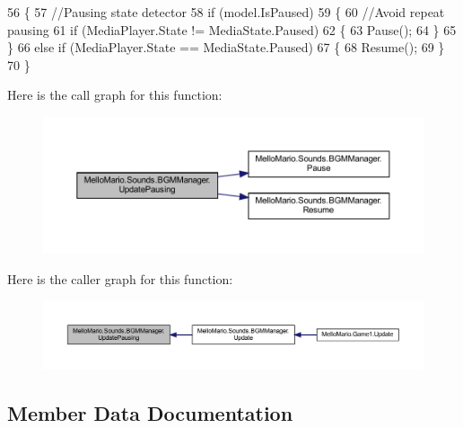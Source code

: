\begin{DoxyCode}
56         \{
57             \textcolor{comment}{//Pausing state detector}
58             \textcolor{keywordflow}{if} (model.IsPaused)
59             \{
60                 \textcolor{comment}{//Avoid repeat pausing}
61                 \textcolor{keywordflow}{if} (MediaPlayer.State != MediaState.Paused)
62                 \{
63                     Pause();
64                 \}
65             \}
66             \textcolor{keywordflow}{else} \textcolor{keywordflow}{if} (MediaPlayer.State == MediaState.Paused)
67             \{
68                 Resume();
69             \}
70         \}
\end{DoxyCode}
Here is the call graph for this function\+:
\nopagebreak
\begin{figure}[H]
\begin{center}
\leavevmode
\includegraphics[width=350pt]{classMelloMario_1_1Sounds_1_1BGMManager_aa88afc7fae97d54e5fabfbdeb3b7d894_cgraph}
\end{center}
\end{figure}
Here is the caller graph for this function\+:
\nopagebreak
\begin{figure}[H]
\begin{center}
\leavevmode
\includegraphics[width=350pt]{classMelloMario_1_1Sounds_1_1BGMManager_aa88afc7fae97d54e5fabfbdeb3b7d894_icgraph}
\end{center}
\end{figure}


\subsection{Member Data Documentation}
\mbox{\label{classMelloMario_1_1Sounds_1_1BGMManager_a3dad7b4f2e294d504b398a984ef5a77f}} 
